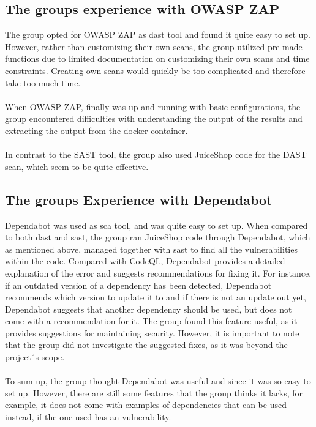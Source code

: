 \subsection{The groups experience with OWASP ZAP}

The group opted for OWASP ZAP as \acrshort{dast} tool and found it quite easy to set up. However, rather than customizing their own scans, the group utilized pre-made functions due to limited documentation on customizing their own scans and time constraints. Creating own scans would quickly be too complicated and therefore take too much time. 
\\~\\
When OWASP ZAP, finally was up and running with basic configurations, the group encountered difficulties with understanding the output of the results and extracting the output from the docker container. 
\\~\\
In contrast to the SAST tool, the group also used JuiceShop code for the  DAST scan, which seem to be quite effective. 



\subsection{The groups Experience with Dependabot}
Dependabot was used as \acrshort{sca} tool, and was quite easy to set up. When compared to both \acrshort{dast} and \acrshort{sast}, the group ran JuiceShop code through Dependabot, which as mentioned above, managed together with \acrshort{sast} to find all the vulnerabilities within the code. 
Compared with CodeQL, Dependabot provides a detailed explanation of the error and suggests recommendations for fixing it. For instance, if an outdated version of a dependency has been detected, Dependabot recommends which version to update it to and if there is not an update out yet, Dependabot suggests that another dependency should be used, but does not come with a recommendation for it.  The group found this feature useful, as it provides suggestions for maintaining security. However, it is important to note that the group did not investigate the suggested fixes, as it was beyond the project´s scope.
\\~\\
To sum up, the group thought Dependabot was useful and since it was so easy to set up. However, there are still some features that the group thinks it lacks, for example, it does not come with examples of dependencies that can be used instead, if the one used has an vulnerability. 

